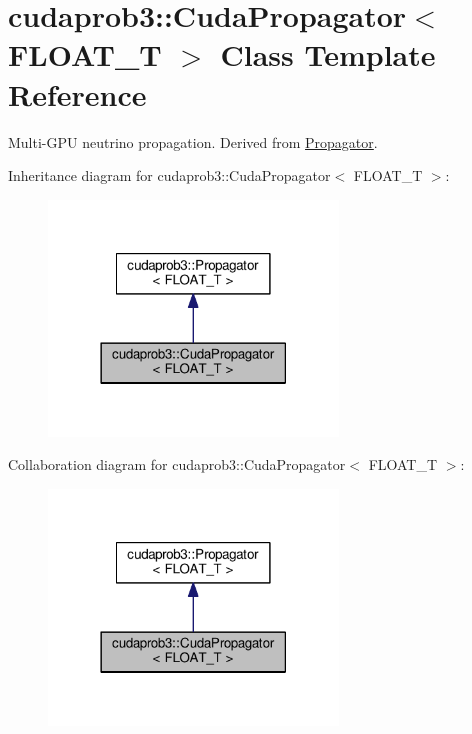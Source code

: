 \hypertarget{classcudaprob3_1_1CudaPropagator}{}\section{cudaprob3\+:\+:Cuda\+Propagator$<$ F\+L\+O\+A\+T\+\_\+T $>$ Class Template Reference}
\label{classcudaprob3_1_1CudaPropagator}


Multi-\/\+G\+PU neutrino propagation. Derived from \hyperlink{classcudaprob3_1_1Propagator}{Propagator}.  




Inheritance diagram for cudaprob3\+:\+:Cuda\+Propagator$<$ F\+L\+O\+A\+T\+\_\+T $>$\+:\nopagebreak
\begin{figure}[H]
\begin{center}
\leavevmode
\includegraphics[width=218pt]{classcudaprob3_1_1CudaPropagator__inherit__graph}
\end{center}
\end{figure}


Collaboration diagram for cudaprob3\+:\+:Cuda\+Propagator$<$ F\+L\+O\+A\+T\+\_\+T $>$\+:\nopagebreak
\begin{figure}[H]
\begin{center}
\leavevmode
\includegraphics[width=218pt]{classcudaprob3_1_1CudaPropagator__coll__graph}
\end{center}
\end{figure}
